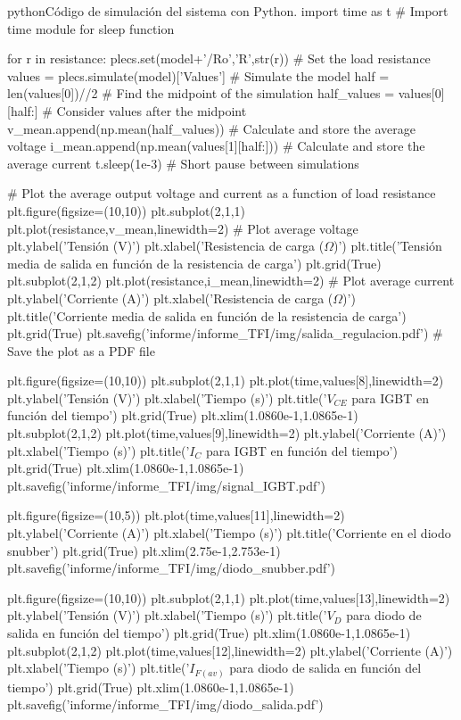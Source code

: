 \begin{appendixd}
\begin{sourcecode}{python}{Código de simulación del sistema con Python.}
	import time as t  # Import time module for sleep function
	
	for r in resistance:
	plecs.set(model+'/Ro','R',str(r))  # Set the load resistance
	values = plecs.simulate(model)['Values']  # Simulate the model
	half = len(values[0])//2  # Find the midpoint of the simulation
	half_values = values[0][half:]  # Consider values after the midpoint
	v_mean.append(np.mean(half_values))  # Calculate and store the average voltage
	i_mean.append(np.mean(values[1][half:]))  # Calculate and store the average current
	t.sleep(1e-3)  # Short pause between simulations
	
	# Plot the average output voltage and current as a function of load resistance
	plt.figure(figsize=(10,10))
	plt.subplot(2,1,1)
	plt.plot(resistance,v_mean,linewidth=2)  # Plot average voltage
	plt.ylabel('Tensión (V)')
	plt.xlabel('Resistencia de carga ($\Omega$)')
	plt.title('Tensión media de salida en función de la resistencia de carga')
	plt.grid(True)
	plt.subplot(2,1,2)
	plt.plot(resistance,i_mean,linewidth=2)  # Plot average current
	plt.ylabel('Corriente (A)')
	plt.xlabel('Resistencia de carga ($\Omega$)')
	plt.title('Corriente media de salida en función de la resistencia de carga')
	plt.grid(True)
	plt.savefig('informe/informe_TFI/img/salida_regulacion.pdf')  # Save the plot as a PDF file
	
	plt.figure(figsize=(10,10))
	plt.subplot(2,1,1)
	plt.plot(time,values[8],linewidth=2)
	plt.ylabel('Tensión (V)')
	plt.xlabel('Tiempo (s)')
	plt.title('$V_{CE}$ para IGBT en función del tiempo')
	plt.grid(True)
	plt.xlim(1.0860e-1,1.0865e-1)
	plt.subplot(2,1,2)
	plt.plot(time,values[9],linewidth=2)
	plt.ylabel('Corriente (A)')
	plt.xlabel('Tiempo (s)')
	plt.title('$I_{C}$ para IGBT en función del tiempo')
	plt.grid(True)
	plt.xlim(1.0860e-1,1.0865e-1)
	plt.savefig('informe/informe_TFI/img/signal_IGBT.pdf')
	
	plt.figure(figsize=(10,5))
	plt.plot(time,values[11],linewidth=2)
	plt.ylabel('Corriente (A)')
	plt.xlabel('Tiempo (s)')
	plt.title('Corriente en el diodo snubber')
	plt.grid(True)
	plt.xlim(2.75e-1,2.753e-1)
	plt.savefig('informe/informe_TFI/img/diodo_snubber.pdf')
	
	plt.figure(figsize=(10,10))
	plt.subplot(2,1,1)
	plt.plot(time,values[13],linewidth=2)
	plt.ylabel('Tensión (V)')
	plt.xlabel('Tiempo (s)')
	plt.title('$V_{D}$ para diodo de salida en función del tiempo')
	plt.grid(True)
	plt.xlim(1.0860e-1,1.0865e-1)
	plt.subplot(2,1,2)
	plt.plot(time,values[12],linewidth=2)
	plt.ylabel('Corriente (A)')
	plt.xlabel('Tiempo (s)')
	plt.title('$I_{F(av)}$ para diodo de salida en función del tiempo')
	plt.grid(True)
	plt.xlim(1.0860e-1,1.0865e-1)
	plt.savefig('informe/informe_TFI/img/diodo_salida.pdf')
	

\end{sourcecode}
\end{appendixd}
